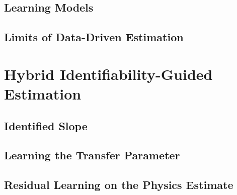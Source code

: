 \documentclass[9pt,journal,a4paper]{IEEEtran}
\begin{document}
\subsection{Learning Models}

\subsection{Limits of Data-Driven Estimation}

\section{Hybrid Identifiability-Guided Estimation}
\label{sec:hybrid}

\subsection{Identified Slope}

\subsection{Learning the Transfer Parameter}

\subsection{Residual Learning on the Physics Estimate}
\end{document}
